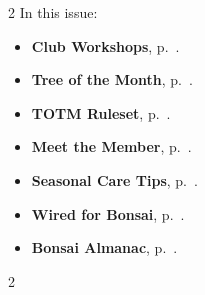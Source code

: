 \setlength{\columnsep}{-5.0cm}
\begin{multicols}{2}
    \noindent\textsf{In this issue:}
    \begin{itemize}
        \item \textsf{\textbf{Club Workshops}}, p.~\pageref{2025-11-workshop}.
        \item \textsf{\textbf{Tree of the Month}}, p.~\pageref{2025-11-contest}.
        \item \textsf{\textbf{TOTM Ruleset}}, p.~\pageref{2025-11-rules}.
        \item \textsf{\textbf{Meet the Member}}, p.~\pageref{2025-11-roots}.
        \item \textsf{\textbf{Seasonal Care Tips}}, p.~\pageref{2025-11-care}.
        \item \textsf{\textbf{Wired for Bonsai}}, p.~\pageref{2025-11-wired}.
        \item \textsf{\textbf{Bonsai Almanac}}, p.~\pageref{2025-11-almanac}.
    \end{itemize}
    \vfill\null
    \columnbreak

    
\end{multicols}
\pagebreak

\setlength{\columnsep}{0.5cm}
\begin{multicols}{2}
    
    
%    
    
    
    
%    
%    
%    
    
    
    
%    
\end{multicols}
